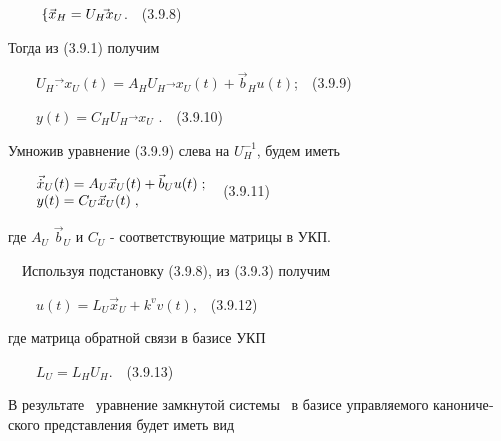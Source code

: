 \documentclass[a4paper]{article}
\newcommand\normalsubformula[1]{\text{\mathversion{normal}$#1$}}
\begin{document}
{\begin{russian}\sffamily
\ \ \ \  $\text{   \{}\vec{\normalsubformula x}_H=U_H\vec{}x_U$.\ \ (3.9.8)
\end{russian}}

{\begin{russian}\sffamily
Тогда из (3.9.1) получим
\end{russian}}

{\begin{russian}\sffamily
\ \ \ \  $U_H\vec{\dot{}}x_U(t)=A_HU_H\vec{}x_U(t)+\vec b_Hu(t)$;\ \ (3.9.9)
\end{russian}}

{\begin{russian}\sffamily
\ \ \ \  $y(t)=C_HU_H\vec{}x_U$ .\ \ (3.9.10)
\end{russian}}

{\begin{russian}\sffamily
Умножив уравнение (3.9.9) слева на  $U_H^{-1}$, будем иметь
\end{russian}}

{\begin{russian}\sffamily
\ \ \ \  $\begin{matrix}\vec{\dot x}_U(t)=A_U\vec x_U(t)+\vec b_Uu(t)\;;\hfill\null \\y(t)=C_U\vec x_U(t)\;,\hfill\null
\end{matrix}\hfill $\ \ (3.9.11)
\end{russian}}

{\begin{russian}\sffamily
где  $A_U$  $\vec b_U$ и  $C_U$ - соответствующие матрицы в УКП.
\end{russian}}

{\begin{russian}\sffamily
\ \ Используя подстановку (3.9.8), из (3.9.3) получим 
\end{russian}}

{\begin{russian}\sffamily
\ \ \ \  $u(t)=L_U\vec x_U+k^vv(t)$,\ \ (3.9.12)
\end{russian}}

{\begin{russian}\sffamily
где матрица обратной связи в базисе УКП
\end{russian}}

{\begin{russian}\sffamily
\ \ \ \  $L_U=L_HU_H$.\ \ (3.9.13)
\end{russian}}

{\begin{russian}\sffamily
В результате \ уравнение замкнутой системы \ в базисе управляемого канонического представле­ния будет иметь вид
\end{russian}}
\end{document}
